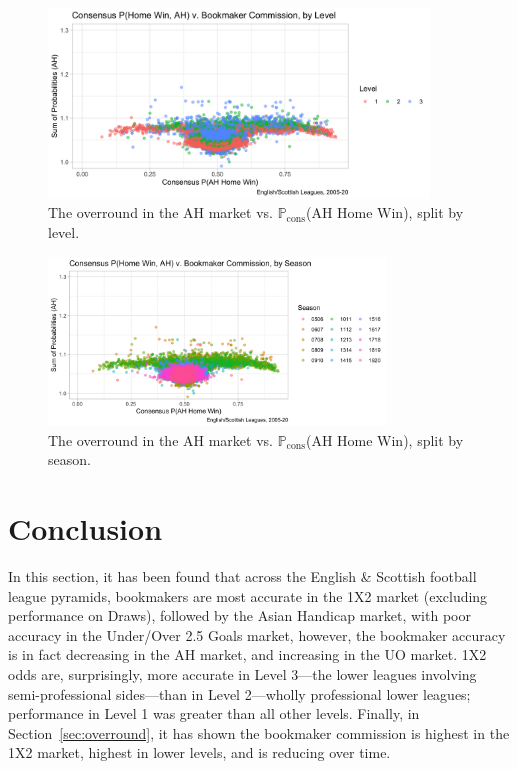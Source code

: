 \documentclass[a4paper,10pt]{report}
\begin{document}
\begin{figure}[h!]\begin{center}
		\includegraphics[width=0.9\textwidth]{ensco_14e_overround_ah_l.png}  
		\caption{The overround in the AH market vs. $\mathbb{P}_{\textrm{cons}}$(AH Home Win), split by level.}\label{FIG:02_07a_overroundah_level}
\end{center}\end{figure}
\begin{figure}[h!]\begin{center}
		\includegraphics[width=0.8\textwidth]{ensco_14f_overround_ah_s.png}  
		\caption{The overround in the AH market vs. $\mathbb{P}_{\textrm{cons}}$(AH Home Win), split by season.}\label{FIG:02_7b_overroundah_season}
\end{center}\end{figure}\pagebreak


\section{Conclusion} \label{sec:enscoconc}
In this section, it has been found that across the English \& Scottish football league pyramids, bookmakers are most accurate in the 1X2 market (excluding performance on Draws), followed by the Asian Handicap market, with poor accuracy in the Under/Over 2.5 Goals market, however, the bookmaker accuracy is in fact decreasing in the AH market, and increasing in the UO market.  1X2 odds are, surprisingly, more accurate in Level 3---the lower leagues involving semi-professional sides---than in Level 2---wholly professional lower leagues; performance in Level 1 was greater than all other levels. Finally, in Section~\ref{sec:overround}, it has shown the bookmaker commission is highest in the 1X2 market, highest in lower levels, and is reducing over time. 
\end{document}
